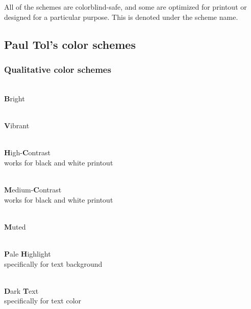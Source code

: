 \documentclass{scrartcl}
\begin{document}
All of the schemes are colorblind-safe, and some are optimized for printout or designed for a particular purpose.
This is denoted under the scheme name.\clearpage

\subsection{Paul Tol's color schemes}\label{sec:Tol_schemes}

\subsubsection{Qualitative color schemes}\label{sec:T-Q}
\begin{minipage}{0.5\textwidth}
    \centering
    \\
    \textbf{B}right\\
    \phantom{pb}
\end{minipage}\hfill%
\begin{minipage}{0.5\textwidth}
    \centering
    \\
    \textbf{V}ibrant
\end{minipage}

\begin{minipage}{0.5\textwidth}
    \centering
    \\
    \textbf{H}igh-\textbf{C}ontrast\\
    works for black and white printout
\end{minipage}\hfill%
\begin{minipage}{0.5\textwidth}
    \centering
    \\
    \textbf{M}edium-\textbf{C}ontrast\\
    works for black and white printout
\end{minipage}

\begin{center}
    \\
    \textbf{M}uted
\end{center}

\begin{minipage}{0.5\textwidth}
    \centering
    \\
    \textbf{P}ale \textbf{H}ighlight\\
    specifically for text background
\end{minipage}\hfill%
\begin{minipage}{0.5\textwidth}
    \centering
    \\
    \textbf{D}ark \textbf{T}ext\\
    specifically for text color
\end{minipage}
\end{document}
